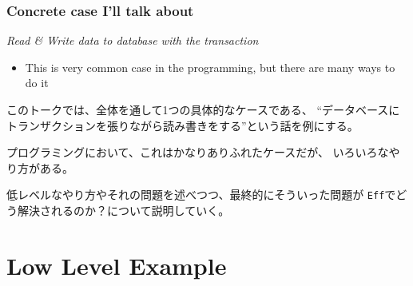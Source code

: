 \begin{frame}
  \frametitle{Concrete case I'll talk about}

  \pause

  \pause
  \begin{shadequote}{}
    \begin{center}
      \itshape\rmfamily\Large
      Read \& Write data to database with the transaction
    \end{center}
  \end{shadequote}

  \begin{itemize}
    \item<+-> This is very common case in the programming, but there are many ways to do it
  \end{itemize}

  \begin{notes}
    \item このトークでは、全体を通して1つの具体的なケースである、
    ``データベースにトランザクションを張りながら読み書きをする''という話を例にする。

    \item プログラミングにおいて、これはかなりありふれたケースだが、
    いろいろなやり方がある。

    \item 低レベルなやり方やそれの問題を述べつつ、最終的にそういった問題が
    \lstinline|Eff|でどう解決されるのか？について説明していく。
  \end{notes}
\end{frame}

\section{Low Level Example}

